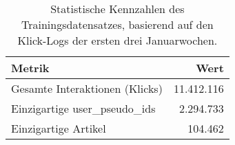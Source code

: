 
\begin{table}[H]
    \centering
    \caption{Statistische Kennzahlen des Trainingsdatensatzes, basierend auf den Klick-Logs der ersten drei Januarwochen.}
    \label{tab:statistiken_training}
    \begin{tabular}{lr}
        \toprule
        \textbf{Metrik} & \textbf{Wert} \\
        \midrule
        Gesamte Interaktionen (Klicks) & 11.412.116 \\
        Einzigartige user\_pseudo\_ids & 2.294.733 \\
        Einzigartige Artikel & 104.462 \\
        \bottomrule
    \end{tabular}
\end{table}